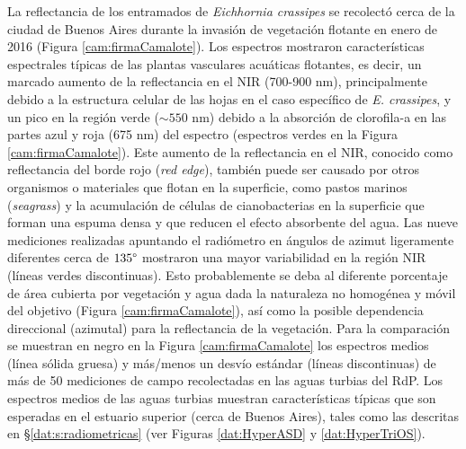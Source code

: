         La reflectancia de los entramados de \textit{Eichhornia crassipes} se recolectó cerca de la ciudad de Buenos Aires durante la invasión de vegetación flotante en enero de 2016 (Figura \ref{cam:firmaCamalote}). Los espectros mostraron características espectrales típicas de las plantas vasculares acuáticas flotantes, es decir, un marcado aumento de la reflectancia en el NIR (700-900 nm), principalmente debido a la estructura celular de las hojas en el caso específico de \textit{E. crassipes}, y un pico en la región verde ($\sim 550$ nm) debido a la absorción de clorofila-a en las partes azul y roja (675 nm) del espectro (espectros verdes en la Figura \ref{cam:firmaCamalote}). Este aumento de la reflectancia en el NIR, conocido como reflectancia del borde rojo (\textit{red edge}), también puede ser causado por otros organismos o materiales que flotan en la superficie, como pastos marinos (\textit{seagrass}) y la acumulación de células de cianobacterias en la superficie que forman una espuma densa y que reducen el efecto absorbente del agua. Las nueve mediciones realizadas apuntando el radiómetro en ángulos de azimut ligeramente diferentes cerca de $135\degree$ mostraron una mayor variabilidad en la región NIR (líneas verdes discontinuas). Esto probablemente se deba al diferente porcentaje de área cubierta por vegetación y agua dada la naturaleza no homogénea y móvil del objetivo (Figura \ref{cam:firmaCamalote}), así como la posible dependencia direccional (azimutal) para la reflectancia de la vegetación. Para la comparación se muestran en negro en la Figura \ref{cam:firmaCamalote} los espectros medios (línea sólida gruesa) y más/menos un desvío estándar (líneas discontinuas) de más de 50 mediciones de campo recolectadas en las aguas turbias del RdP. Los espectros medios de las aguas turbias muestran características típicas que son esperadas en el estuario superior (cerca de Buenos Aires), tales como las descritas en \S \ref{dat:s:radiometricas} (ver Figuras \ref{dat:HyperASD} y \ref{dat:HyperTriOS}).



